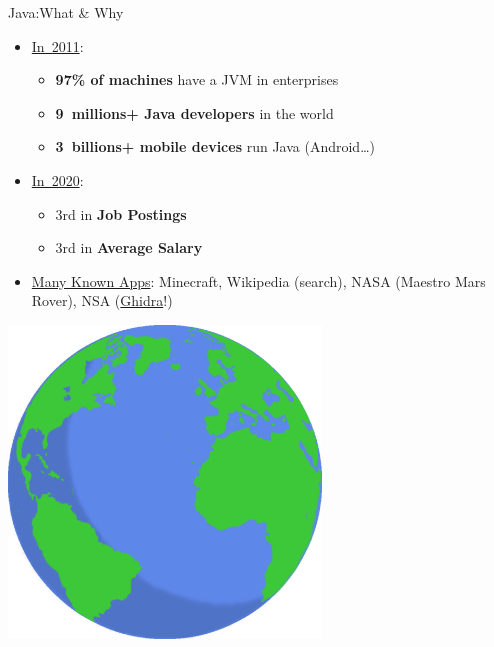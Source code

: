 \documentclass[English,c,%
hyperref={%
    pdftitle={FISA-DE2 OOP in Java},%
    pdfauthor={Muller, Gravier, Laforest, Subercaze},%
    pdfsubject={OOP in Java},%
    pdfkeywords={OOP, Java},%
    colorlinks=true,%
    urlcolor=blue,%
    linkcolor=%
    },%
xcolor={pdftex,svgnames} %
]{beamer}
\begin{document}
\begin{frame}{Java:What \& Why}
  \hspace{3cm}
  \begin{itemize}
    \item \href{https://www.jmdoudoux.fr/java/dej/chap-presentation.htm}{In~2011}:
    \begin{itemize}
      \item \textbf{97\% of machines} have a JVM in enterprises
      \medskip
      \item \textbf{9~millions+ Java developers} in the world
      \medskip
      \item \textbf{3~billions+ mobile devices} run Java (Android\ldots{})
      \medskip
    \end{itemize}
  \end{itemize}
  \medskip
  \begin{itemize}
    \item \href{https://www.codeplatoon.org/best-paying-most-in-demand-programming-languages-2020/}{In~2020}:
    \begin{itemize}
      \item 3rd in \textbf{Job Postings}
      \item 3rd in \textbf{Average Salary}
    \end{itemize}
%
  \item \href{https://blogs.oracle.com/javamagazine/the-top-25-greatest-java-apps-ever-written}{Many Known Apps}: Minecraft, Wikipedia (search), NASA (Maestro Mars Rover), NSA (\href{https://www.wired.com/story/nsa-ghidra-open-source-tool/}{Ghidra}!) %
%
  \end{itemize}

\bigskip
  \begin{center}
    \includegraphics[height=8.3cm]{images01/earth1.png}
  \end{center}

\end{frame}
\end{document}
